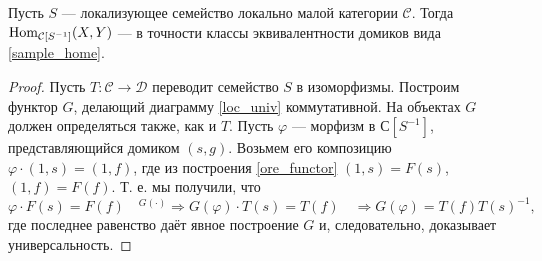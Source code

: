 \documentclass[../main.tex]{subfiles}
\begin{document}
\begin{to_thr}
 Пусть $S$ --- локализующее семейство локально малой категории $\mathcal{C}$. Тогда $\operatorname{Hom}_{\mathcal{C}[S^{-1}]}(X, Y)$ --- в точности классы эквивалентности домиков вида \eqref{sample_home}.
 \label{ore_loc_desc}
 \end{to_thr}
 \begin{proof}
 Пусть $T:\mathcal{C}\to \mathcal{D}$ переводит семейство $S$ в изоморфизмы. Построим функтор $G$, делающий диаграмму \ref{loc_univ} коммутативной.
На объектах $G$ должен определяться также, как и $T$. Пусть $\varphi$ --- морфизм в $\mathcal{С}[S^{-1}]$, представляющийся домиком $(s, g)$.  Возьмем его композицию $\varphi\cdot (1, s) = (1, f)$, где из построения \eqref{ore_functor} $(1, s) = F(s)$, $(1, f) = F(f)$. Т. е. мы получили, что
\begin{equation*}
	\varphi\cdot F(s) = F(f)\quad {}^{G(\cdot)}
	 \Rightarrow G(\varphi)\cdot T(s) = T(f)\quad
	 \Rightarrow G(\varphi) = T(f)T(s)^{-1},
      \end{equation*}
где последнее равенство даёт явное построение $G$ и, следовательно, доказывает универсальность.
\end{proof}
\end{document}
